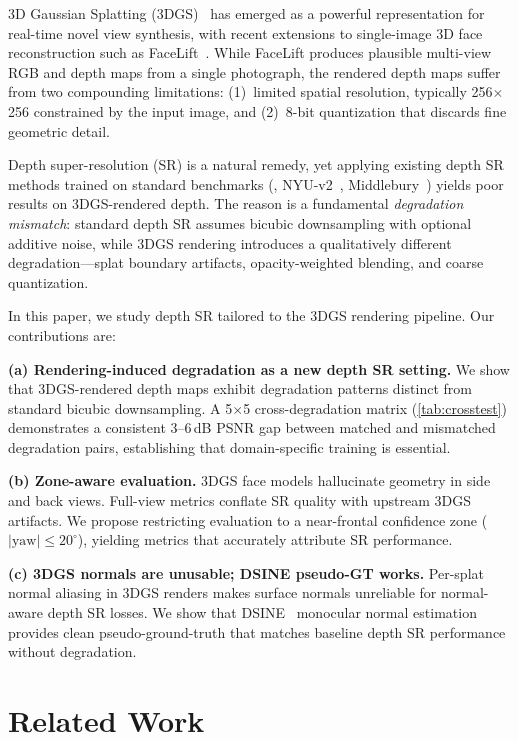 \documentclass[10pt,twocolumn,letterpaper]{article}
\begin{document}
3D Gaussian Splatting (3DGS)~\cite{kerbl20233dgs} has emerged as a powerful representation for real-time novel view synthesis, with recent extensions to single-image 3D face reconstruction such as FaceLift~\cite{wu2024facelift}.
While FaceLift produces plausible multi-view RGB and depth maps from a single photograph, the rendered depth maps suffer from two compounding limitations: (1)~limited spatial resolution, typically 256$\times$256 constrained by the input image, and (2)~8-bit quantization that discards fine geometric detail.

Depth super-resolution (SR) is a natural remedy, yet applying existing depth SR methods trained on standard benchmarks (\eg, NYU-v2~\cite{silberman2012nyuv2}, Middlebury~\cite{scharstein2014middlebury}) yields poor results on 3DGS-rendered depth.
The reason is a fundamental \emph{degradation mismatch}: standard depth SR assumes bicubic downsampling with optional additive noise, while 3DGS rendering introduces a qualitatively different degradation---splat boundary artifacts, opacity-weighted blending, and coarse quantization.

In this paper, we study depth SR tailored to the 3DGS rendering pipeline.
Our contributions are:

\noindent\textbf{(a) Rendering-induced degradation as a new depth SR setting.}
We show that 3DGS-rendered depth maps exhibit degradation patterns distinct from standard bicubic downsampling.
A 5$\times$5 cross-degradation matrix (\cref{tab:crosstest}) demonstrates a consistent 3--6\,dB PSNR gap between matched and mismatched degradation pairs, establishing that domain-specific training is essential.

\noindent\textbf{(b) Zone-aware evaluation.}
3DGS face models hallucinate geometry in side and back views.
Full-view metrics conflate SR quality with upstream 3DGS artifacts.
We propose restricting evaluation to a near-frontal confidence zone ($|\text{yaw}| \leq 20^\circ$), yielding metrics that accurately attribute SR performance.

\noindent\textbf{(c) 3DGS normals are unusable; DSINE pseudo-GT works.}
Per-splat normal aliasing in 3DGS renders makes surface normals unreliable for normal-aware depth SR losses.
We show that DSINE~\cite{bae2024dsine} monocular normal estimation provides clean pseudo-ground-truth that matches baseline depth SR performance without degradation.

\section{Related Work}
\label{sec:related}
\end{document}
